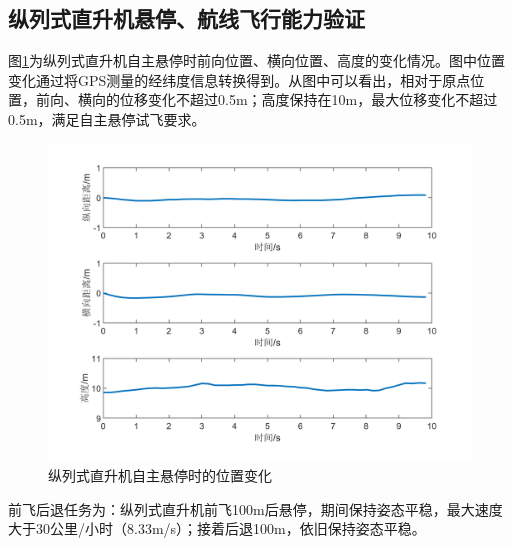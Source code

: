 \subsection{纵列式直升机悬停、航线飞行能力验证}
图\ref{fig:chap7:hover}为纵列式直升机自主悬停时前向位置、横向位置、高度的变化情况。图中位置变化通过将GPS测量的经纬度信息转换得到。从图中可以看出，相对于原点位置，前向、横向的位移变化不超过0.5m；高度保持在10m，最大位移变化不超过0.5m，满足自主悬停试飞要求。
\begin{figure}[htb!]
    \centering
    \includegraphics[width = 14cm]{fig/figure_chap7/hover.png}
    \caption{纵列式直升机自主悬停时的位置变化\label{fig:chap7:hover}}
\end{figure}

前飞后退任务为：纵列式直升机前飞100m后悬停，期间保持姿态平稳，最大速度大于30公里/小时（8.33m/s）；接着后退100m，依旧保持姿态平稳。

